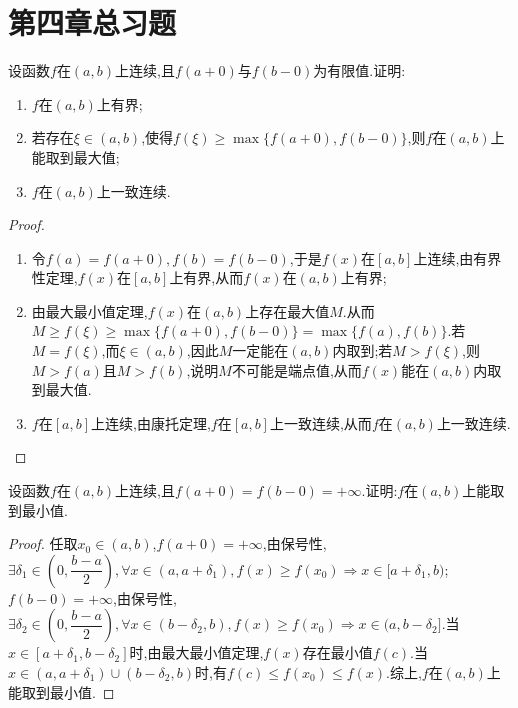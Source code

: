 \section{第四章总习题}
\begin{problem}
    设函数$f$在$(a,b)$上连续,且$f(a+0)$与$f(b-0)$为有限值.证明:
    \begin{enumerate}
        \item $f$在$(a,b)$上有界;
        \item 若存在$\xi\in(a,b)$,使得$f(\xi)\geq\max\{f(a+0),f(b-0)\}$,则$f$在$(a,b)$上能取到最大值;
        \item $f$在$(a,b)$上一致连续.
    \end{enumerate}
\end{problem}
\begin{proof}
    \begin{enumerate}
        \item 令$f(a)=f(a+0),f(b)=f(b-0)$,于是$f(x)$在$[a,b]$上连续,由有界性定理,$f(x)$在$[a,b]$上有界,从而$f(x)$在$(a,b)$上有界;
        \item 由最大最小值定理,$f(x)$在$(a,b)$上存在最大值$M$.从而$M\geq f(\xi)\geq\max\{f(a+0),f(b-0)\}=\max\{f(a),f(b)\}$.若$M=f(\xi)$,而$\xi\in(a,b)$,因此$M$一定能在$(a,b)$内取到;若$M>f(\xi)$,则$M>f(a)$且$M>f(b)$,说明$M$不可能是端点值,从而$f(x)$能在$(a,b)$内取到最大值.
        \item $f$在$[a,b]$上连续,由康托定理,$f$在$[a,b]$上一致连续,从而$f$在$(a,b)$上一致连续.
    \end{enumerate}
\end{proof}
\begin{problem}
    设函数$f$在$(a,b)$上连续,且$f(a+0)=f(b-0)=+\infty$.证明:$f$在$(a,b)$上能取到最小值.
\end{problem}
\begin{proof}
    任取$x_0\in(a,b)$,$f(a+0)=+\infty$,由保号性,$\displaystyle\exists\delta_1\in(0,\dfrac{b-a}{2}),\forall x\in(a,a+\delta_1),f(x)\geq f(x_0)\Rightarrow x\in[a+\delta_1,b)$;$f(b-0)=+\infty$,由保号性,$\displaystyle\exists\delta_2\in(0,\dfrac{b-a}{2}),\forall x\in(b-\delta_2,b),f(x)\geq f(x_0)\Rightarrow x\in(a,b-\delta_2]$.当$x\in[a+\delta_1,b-\delta_2]$时,由最大最小值定理,$f(x)$存在最小值$f(c)$.当$x\in(a,a+\delta_1)\cup(b-\delta_2,b)$时,有$f(c)\leq f(x_0)\leq f(x)$.综上,$f$在$(a,b)$上能取到最小值.
\end{proof}